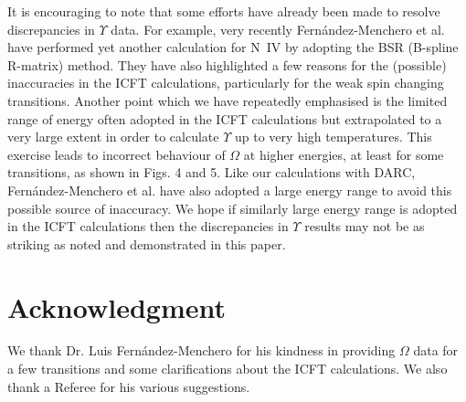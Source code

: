 \documentclass[fleqn]{article}
\begin{document}
It is encouraging to note that some efforts have already been made to resolve discrepancies in $\Upsilon$ data. For example, very recently Fern{\'a}ndez-Menchero et al. \cite{kbniv} have performed yet another calculation for N~IV by adopting the BSR (B-spline R-matrix) method. They have also highlighted a few reasons for the (possible) inaccuracies in the ICFT calculations, particularly for the weak spin changing transitions. Another point which we have repeatedly emphasised is the limited range  of energy often adopted in the ICFT calculations but extrapolated to a very large extent in order to calculate $\Upsilon$ up to very high temperatures. This exercise leads to incorrect behaviour of $\Omega$ at higher energies, at least for some transitions, as shown in Figs. 4 and 5. Like our calculations with DARC, Fern{\'a}ndez-Menchero et al. \cite{kbniv} have also adopted a large energy range to avoid this possible source of inaccuracy. We hope if similarly large energy range is adopted in the ICFT calculations then the discrepancies in $\Upsilon$ results may not be as striking as noted and demonstrated in this paper.


\section*{Acknowledgment}  

We thank Dr. Luis Fern{\'a}ndez-Menchero for his kindness in providing $\Omega$ data for a few transitions and some clarifications about the ICFT calculations.  We also thank a Referee for his various suggestions.
\end{document}
